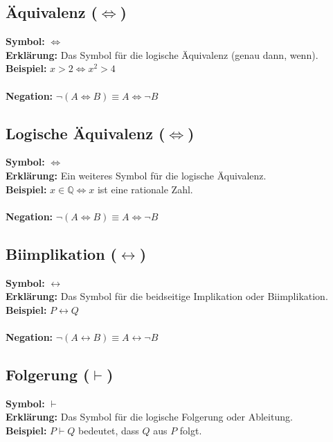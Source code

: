 \documentclass[12pt,a4paper]{article}
\begin{document}
\subsection{Äquivalenz (\texorpdfstring{$\iff$}{iff})}
\textbf{Symbol:} $\iff$ \\
\textbf{Erklärung:} Das Symbol für die logische Äquivalenz (genau dann, wenn). \\
\textbf{Beispiel:} $x > 2 \iff x^2 > 4$ \\ \\
\textbf{Negation:} $\neg (A \iff B) \equiv A \iff \neg B$

\subsection{Logische Äquivalenz (\texorpdfstring{$\Leftrightarrow$}{Leftrightarrow})}
\textbf{Symbol:} $\Leftrightarrow$ \\
\textbf{Erklärung:} Ein weiteres Symbol für die logische Äquivalenz. \\
\textbf{Beispiel:} $x \in \mathbb{Q} \Leftrightarrow x$ ist eine rationale Zahl. \\ \\
\textbf{Negation:} $\neg (A \Leftrightarrow B) \equiv A \Leftrightarrow \neg B$

\subsection{Biimplikation (\texorpdfstring{$\leftrightarrow$}{leftrightarrow})}
\textbf{Symbol:} $\leftrightarrow$ \\
\textbf{Erklärung:} Das Symbol für die beidseitige Implikation oder Biimplikation. \\
\textbf{Beispiel:} $P \leftrightarrow Q$ \\ \\
\textbf{Negation:} $\neg (A \leftrightarrow B) \equiv A \leftrightarrow \neg B$

\subsection{Folgerung (\texorpdfstring{$\vdash$}{vdash})}
\textbf{Symbol:} $\vdash$ \\
\textbf{Erklärung:} Das Symbol für die logische Folgerung oder Ableitung. \\
\textbf{Beispiel:} $P \vdash Q$ bedeutet, dass $Q$ aus $P$ folgt.
\end{document}
